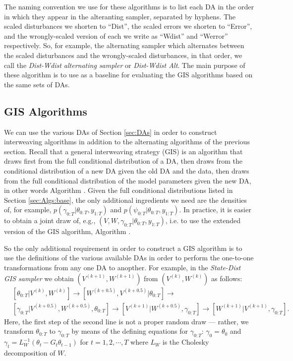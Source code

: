 \documentclass{article}
\begin{document}
The naming convention we use for these algorithms is to list each DA in the order in which they appear in the alteranting sampler, separated by hyphens. The scaled disturbances we shorten to ``Dist'', the scaled errors we shorten to ``Error'', and the wrongly-scaled version of each we write as ``Wdist'' and ``Werror'' respectively. So, for example, the alternating sampler which alternates between the scaled disturbances and the wrongly-scaled disturbances, in that order, we call the {\it Dist-Wdist alternating sampler} or {\it Dist-Wdist Alt}. The main purpose of these algorithm is to use as a baseline for evaluating the GIS algorithms based on the same sets of DAs.

\subsection{GIS Algorithms}\label{sec:Algs:GIS}
We can use the various DAs of Section \ref{sec:DAs} in order to construct interweaving algorithms in addition to the alternating algorithms of the previous section. Recall that a general interweaving strategy (GIS) is an algorithm that draws first from the full conditional distribution of a DA, then draws from the conditional distribution of a new DA given the old DA and the data, then draws from the full conditional distribution of the model parameters given the new DA, in other words Algorithm . Given the full conditional distributions listed in Section \ref{sec:Algs:base}, the only additional ingredients we need are the densities of, for example, $p(\gamma_{0:T}|\theta_{0:T},y_{1:T})$ and $p(\psi_{0:T}|\theta_{0:T},y_{1:T})$. In practice, it is easier to obtain a joint draw of, e.g., $(V,W,\gamma_{0:T}|\theta_{0:T},y_{1:T})$, i.e. to use the extended version of the GIS algorithm, Algorithm .

So the only additional requirement in order to construct a GIS algorithm is to use the definitions of the various available DAs in order to perform the one-to-one transformations from any one DA to anopther. For example, in the {\it State-Dist GIS sampler} we obtain $(V^{(k+1)},W^{(k+1)})$ from $(V^{(k)},W^{(k)})$ as follows:
\begin{align*}
&[\theta_{0:T}|V^{(k)},W^{(k)}] \to [W^{(k+0.5)},V^{(k+0.5)}|\theta_{0:T}] \to\\
&[\gamma_{0:T}|V^{(k+0.5)},W^{(k+0.5)},\theta_{0:T}] \to [V^{(k+1)}|W^{(k+0.5)},\gamma_{0:T}] \to [W^{(k+1)}|V^{(k+1)},\gamma_{0:T}].
\end{align*}
Here, the first step of the second line is not a proper random draw --- rather, we transform $\theta_{0:T}$ to $\gamma_{0:T}$ by means of the defining equations for $\gamma_{0:T}$: $\gamma_0=\theta_0$ and $\gamma_t = L_W^{-1}(\theta_t - G_t\theta_{t-1})$ for $t=1,2,\cdots,T$ where $L_W$ is the Cholesky decomposition of $W$. 
\end{document}
